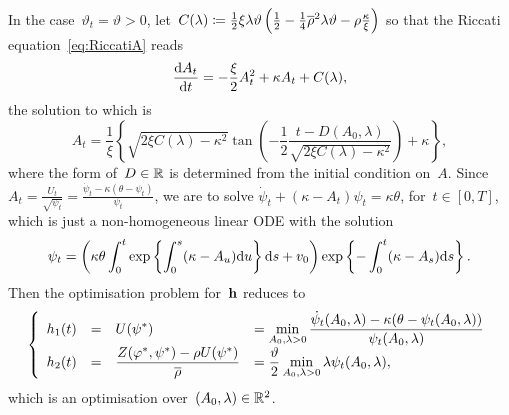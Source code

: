 \begin{example}\label{ex:HestonSmallNoiseLDP}
In the case~$\vartheta_t=\vartheta>0$, let~${C(\lambda)\coloneqq \frac12\xi\lambda\vartheta\left(\frac12-\frac14\overline{\rho}^2\lambda\vartheta-\rho\frac\kappa\xi\right)}$ so that the Riccati equation~\eqref{eq:RiccatiA} reads
\[
\frac{\mathrm{d} A_t}{\mathrm{d} t} = -\frac\xi 2 A^2_t + \kappa A_t + C(\lambda),
\]
the solution to which is
$$
A_t = \frac1\xi\left\{\sqrt{2\xi C(\lambda)-\kappa^2}\tan\left(-\frac12\frac{t-D(A_0, \lambda)}{\sqrt{2\xi C(\lambda)-\kappa^2}}\right)+\kappa\right\},
$$
where the form of~$D\in\mathbb{R}$ is determined from the initial condition on~$A$. Since~${A_t=\tfrac{U_t}{\sqrt{\psi_t}}=\tfrac{\dot\psi_t-\kappa(\theta-\psi_t)}{\psi_t}}$, we are to solve
$\dot\psi_t + (\kappa - A_t)\psi_t = \kappa\theta$,
for~$t \in[0,T]$,
which is just a non-homogeneous linear ODE with the solution
$$
\psi_t = \left(\kappa\theta\int_0^t 
\exp\left\{\int_0^s (\kappa-A_u)\mathrm{d} u\right\}\mathrm{d} s + v_0\right)
\exp\left\{-\int_0^t (\kappa-A_s)\mathrm{d} s\right\}.
$$
Then the optimisation problem for~$\boldsymbol{\mathrm{h}}$ reduces to
\begin{equation*}
\left\{
\begin{array}{rcll}
h_1(t)
 & = & \displaystyle U(\psi^{*})
 & = \displaystyle \min_{A_0, \lambda>0} \frac{\dot \psi_t(A_0, \lambda)-\kappa(\theta-\psi_t(A_0, \lambda))}{\psi_t(A_0, \lambda)} \\
h_2(t)
& = & \displaystyle \frac{Z(\varphi^{*}, \psi^{*})-\rho U(\psi^{*})}{\overline{\rho}}
& = \displaystyle \frac{\vartheta}{2}\min_{A_0, \lambda>0} \lambda\psi_t(A_0, \lambda),
\end{array}
\right.
\end{equation*}
which is an optimisation over~$(A_0,\lambda)\in \mathbb{R}^2$.
\end{example}

